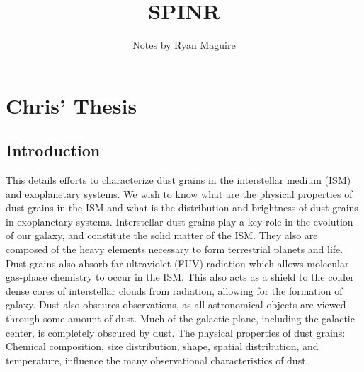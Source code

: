 \documentclass[10pt]{article}
\title{SPINR}
\author{Notes by Ryan Maguire}
\date{\vspace{-5ex}}
\theoremstyle{definition}
\begin{document}
\maketitle
\tableofcontents

\section{Chris' Thesis}
\subsection{Introduction}
This details efforts to characterize dust grains in the interstellar medium (ISM) and exoplanetary systems. We wish to know what are the physical properties of dust grains in the ISM and what is the distribution and brightness of dust grains in exoplanetary systems. Interstellar dust grains play a key role in the evolution of our galaxy, and constitute the solid matter of the ISM. They also are composed of the heavy elements necessary to form terrestrial planets and life. Dust grains also absorb far-ultraviolet (FUV) radiation which allows molecular gas-phase chemistry to occur in the ISM. This also acts as a shield to the colder dense cores of interstellar clouds from radiation, allowing for the formation of galaxy. Dust also obscures observations, as all astronomical objects are viewed through some amount of dust. Much of the galactic plane, including the galactic center, is completely obscured by dust. The physical properties of dust grains: Chemical composition, size distribution, shape, spatial distribution, and temperature, influence the many observational characteristics of dust. 
\end{document}
